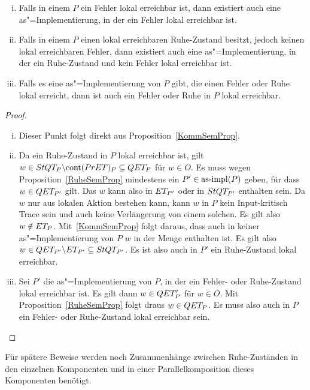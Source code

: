 \begin{Kor}\mbox{}
  \label{lokaleRuheErrKor}
  \begin{enumerate}[(i)]
    \item Falls in einem \MEIO{} $P$ ein Fehler lokal erreichbar ist, dann
      existiert auch eine as"=Implementierung, in der ein Fehler lokal
      erreichbar ist.
    \item Falls in einem \MEIO{} $P$ einen lokal erreichbaren Ruhe-Zustand
      besitzt, jedoch keinen lokal erreichbaren Fehler, dann existiert auch
      eine as"=Implementierung, in der ein Ruhe-Zustand und kein Fehler lokal
      erreichbar ist.
    \item Falls es eine as"=Implementierung von $P$ gibt, die einen Fehler oder
      Ruhe lokal erreicht, dann ist auch ein Fehler oder Ruhe in $P$ lokal
      erreichbar.
  \end{enumerate}
\end{Kor}
\begin{proof}\mbox{}
  \begin{enumerate}[(i)]
    \item Dieser Punkt folgt direkt aus Proposition~\ref{KommSemProp}.
    \item Da ein Ruhe-Zustand in $P$ lokal erreichbar ist, gilt $w\in StQT
      _P\backslash \mathrm{cont} (PrET) _P \subseteq QET _P$ für $w\in O$. Es muss
      wegen Proposition~\ref{RuheSemProp} mindestens ein $P'\in \mathrm{as}\text{-}\mathrm{impl} (P)$
      geben, für dass $w\in QET _{P'}$ gilt. Das $w$ kann also in $ET _{P'}$
      oder in $StQT _{P'}$ enthalten sein. Da $w$ nur aus lokalen Aktion
      bestehen kann, kann $w$ in $P$ kein Input-kritisch Trace sein und auch
      keine Verlängerung von einem solchen. Es gilt also $w\notin ET _P$.
      Mit~\ref{KommSemProp} folgt daraus, dass auch in keiner
      as"=Implementierung von $P$ $w$ in der Menge \ET{} enthalten ist. Es gilt
      also $w\in QET _{P'} \backslash ET _{P'} \subseteq StQT _{P'}$. Es ist
      also auch in $P'$ ein Ruhe-Zustand lokal erreichbar.
    \item Sei $P'$ die as"=Implementierung von $P$, in der ein Fehler- oder
      Ruhe-Zustand lokal erreichbar ist. Es gilt dann $w\in QET _P'$ für $w\in
      O$. Mit Proposition~\ref{RuheSemProp} folgt draus $w\in QET _P$. Es muss
      also auch in $P$ ein Fehler- oder Ruhe-Zustand lokal erreichbar sein.
  \end{enumerate}
\end{proof}

Für spätere Beweise werden noch Zusammenhänge zwischen Ruhe-Zuständen in den
einzelnen Komponenten und in einer Parallelkomposition dieses Komponenten
benötigt.

